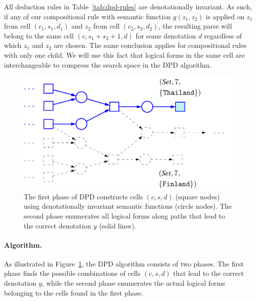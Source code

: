 All deduction rules in Table~\ref{tab:dpd-rules}
are denotationally invariant.
As such, if any of our compositional rule
with semantic function $g(z_1, z_2)$
is applied on $z_1$ from cell $(c_1, s_1, d_1)$
and $z_2$ from cell $(c_2, s_2, d_2)$,
the resulting parse will belong to the same cell
$(c, s_1 + s_2 + 1, d)$ for some denotation $d$
regardless of which $z_1$ and $z_2$ are chosen.
The same conclusion applies for
compositional rules with only one child.
We will use this fact that logical forms in the same cell
are interchangeable to compress the search space
in the DPD algorithm.

\begin{figure}
\centering
\includegraphics[scale=.4]{sfig/dpd.slides/dpdConcept.pdf}
\caption[Illustration of the DPD algorithm.]
{The first phase of DPD constructs
cells $(c,s,d)$ (square nodes)
using denotationally invariant semantic functions
(circle nodes).
The second phase enumerates all logical forms
along paths that lead to the correct
denotation $y$ ({\color{blue}solid lines}).}
\label{fig:dpd-figure}
\end{figure}

\paragraph{Algorithm.}
As illustrated in Figure~\ref{fig:dpd-figure},
the DPD algorithm consists of two phases.
The first phase finds the possible combinations of cells
$(c, s, d)$ that lead to the correct denotation $y$,
while the second phase enumerates the actual logical forms
belonging to the cells found in the first phase.

